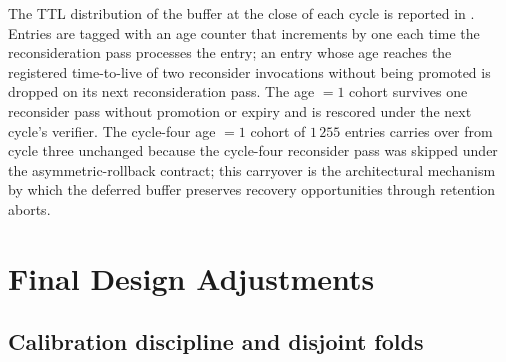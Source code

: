 

The TTL distribution of the buffer at the close of each cycle is reported in . Entries are tagged with an age counter that increments by one each time the reconsideration pass processes the entry; an entry whose age reaches the registered time-to-live of two reconsider invocations without being promoted is dropped on its next reconsideration pass. The age $=1$ cohort survives one reconsider pass without promotion or expiry and is rescored under the next cycle's verifier. The cycle-four age $=1$ cohort of $1\,255$ entries carries over from cycle three unchanged because the cycle-four reconsider pass was skipped under the asymmetric-rollback contract; this carryover is the architectural mechanism by which the deferred buffer preserves recovery opportunities through retention aborts.





\FloatBarrier

\section{Final Design Adjustments}
\label{sec:final-adjustments}

\subsection{Calibration discipline and disjoint folds}
\label{sec:adj-discipline}

